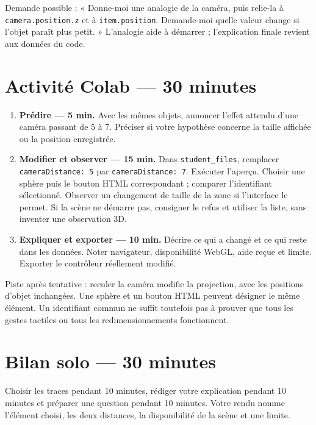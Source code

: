 \documentclass[
  canadien,
  11pt,
  a4paper,
]{report}
\providecommand{\tightlist}{%
  \setlength{\itemsep}{0pt}\setlength{\parskip}{0pt}}
\begin{document}
Demande possible : « Donne-moi une analogie de la caméra, puis relie-la
à \texttt{camera.position.z} et à \texttt{item.position}. Demande-moi
quelle valeur change si l'objet paraît plus petit. » L'analogie aide à
démarrer ; l'explication finale revient aux données du code.

\section{Activité Colab --- 30
minutes}\label{activituxe9-colab-30-minutes-2}

\begin{enumerate}
\def\labelenumi{\arabic{enumi}.}
\tightlist
\item
  \textbf{Prédire --- 5 min.} Avec les mêmes objets, annoncer l'effet
  attendu d'une caméra passant de 5 à 7. Préciser si votre hypothèse
  concerne la taille affichée ou la position enregistrée.
\item
  \textbf{Modifier et observer --- 15 min.} Dans
  \texttt{student\_\allowbreak{}files}, remplacer \texttt{camera\allowbreak{}Distance:\ 5} par
  \texttt{camera\allowbreak{}Distance:\ 7}. Exécuter l'aperçu. Choisir une sphère
  puis le bouton HTML correspondant ; comparer l'identifiant
  sélectionné. Observer un changement de taille de la zone si
  l'interface le permet. Si la scène ne démarre pas, consigner le refus
  et utiliser la liste, sans inventer une observation 3D.
\item
  \textbf{Expliquer et exporter --- 10 min.} Décrire ce qui a changé et
  ce qui reste dans les données. Noter navigateur, disponibilité WebGL,
  aide reçue et limite. Exporter le contrôleur réellement modifié.
\end{enumerate}

Piste après tentative : reculer la caméra modifie la projection, avec
les positions d'objet inchangées. Une sphère et un bouton HTML peuvent
désigner le même élément. Un identifiant commun ne suffit toutefois pas
à prouver que tous les gestes tactiles ou tous les redimensionnements
fonctionnent.

\section{Bilan solo --- 30 minutes}\label{bilan-solo-30-minutes-2}

Choisir les traces pendant 10 minutes, rédiger votre explication pendant
10 minutes et préparer une question pendant 10 minutes. Votre rendu
nomme l'élément choisi, les deux distances, la disponibilité de la scène
et une limite.
\end{document}
